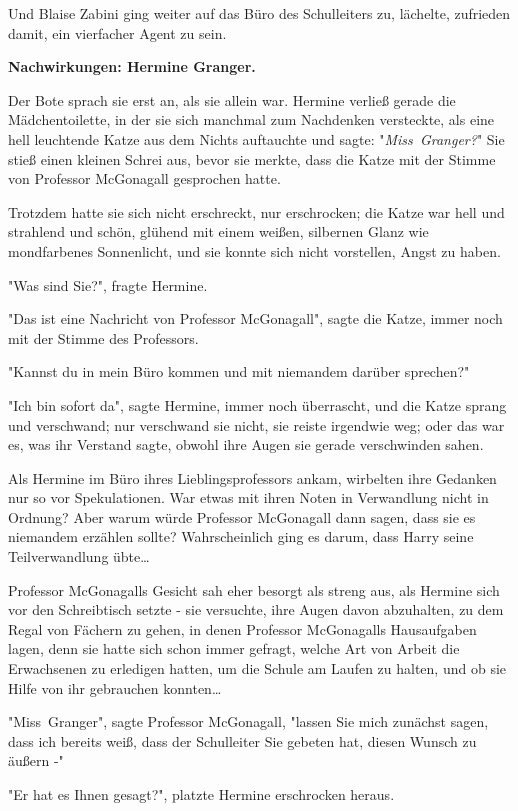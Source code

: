 {Und Blaise Zabini ging weiter auf das Büro des Schulleiters zu, lächelte, zufrieden damit, ein vierfacher Agent zu sein.

\textbf{Nachwirkungen: Hermine Granger.}

Der Bote sprach sie erst an, als sie allein war. Hermine verließ gerade die Mädchentoilette, in der sie sich manchmal zum Nachdenken versteckte, als eine hell leuchtende Katze aus dem Nichts auftauchte und sagte: "\emph{Miss~Granger?}" Sie stieß einen kleinen Schrei aus, bevor sie merkte, dass die Katze mit der Stimme von Professor McGonagall gesprochen hatte.

Trotzdem hatte sie sich nicht erschreckt, nur erschrocken; die Katze war hell und strahlend und schön, glühend mit einem weißen, silbernen Glanz wie mondfarbenes Sonnenlicht, und sie konnte sich nicht vorstellen, Angst zu haben.

"Was sind Sie?", fragte Hermine.

"Das ist eine Nachricht von Professor McGonagall", sagte die Katze, immer noch mit der Stimme des Professors.

"Kannst du in mein Büro kommen und mit niemandem darüber sprechen?"

"Ich bin sofort da", sagte Hermine, immer noch überrascht, und die Katze sprang und verschwand; nur verschwand sie nicht, sie reiste irgendwie weg; oder das war es, was ihr Verstand sagte, obwohl ihre Augen sie gerade verschwinden sahen.

Als Hermine im Büro ihres Lieblingsprofessors ankam, wirbelten ihre Gedanken nur so vor Spekulationen. War etwas mit ihren Noten in Verwandlung nicht in Ordnung? Aber warum würde Professor McGonagall dann sagen, dass sie es niemandem erzählen sollte? Wahrscheinlich ging es darum, dass Harry seine Teilverwandlung übte…

Professor McGonagalls Gesicht sah eher besorgt als streng aus, als Hermine sich vor den Schreibtisch setzte - sie versuchte, ihre Augen davon abzuhalten, zu dem Regal von Fächern zu gehen, in denen Professor McGonagalls Hausaufgaben lagen, denn sie hatte sich schon immer gefragt, welche Art von Arbeit die Erwachsenen zu erledigen hatten, um die Schule am Laufen zu halten, und ob sie Hilfe von ihr gebrauchen konnten…

"Miss~Granger", sagte Professor McGonagall, "lassen Sie mich zunächst sagen, dass ich bereits weiß, dass der Schulleiter Sie gebeten hat, diesen Wunsch zu äußern -"

"Er hat es Ihnen gesagt?", platzte Hermine erschrocken heraus.

}
